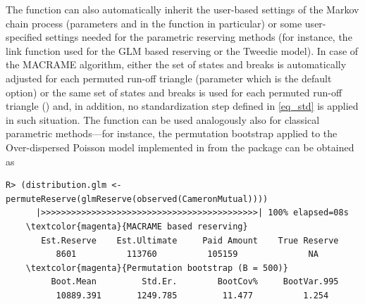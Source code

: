 The  function can also automatically inherit the user-based settings of the Markov chain process (parameters  and  in the  function in particular) or some user-specified settings needed for the parametric reserving methods (for instance, the link function used for the GLM based reserving or the Tweedie model). In case of the MACRAME algorithm, either the set of states and breaks is automatically adjusted for each permuted run-off triangle (parameter  which is the default option) or the same set of states and breaks is used for each permuted run-off triangle () and, in addition, no standardization step defined in \eqref{eq_std} is applied in such situation. The  function can be used analogously also for classical parametric methods---for instance, the permutation bootstrap applied to the Over-dispersed Poisson model implemented in  from the  package can be obtained as 
\begin{Verbatim}[commandchars=\\\{\}]
    R> (distribution.glm <- permuteReserve(glmReserve(observed(CameronMutual))))
      |>>>>>>>>>>>>>>>>>>>>>>>>>>>>>>>>>>>>>>>>>>>| 100% elapsed=08s
    \textcolor{magenta}{MACRAME based reserving}
       Est.Reserve    Est.Ultimate     Paid Amount    True Reserve 
          8601          113760          105159              NA 
    \textcolor{magenta}{Permutation bootstrap (B = 500)}
         Boot.Mean         Std.Er.        BootCov%     BootVar.995 
          10889.391       1249.785         11.477          1.254 
\end{Verbatim}

